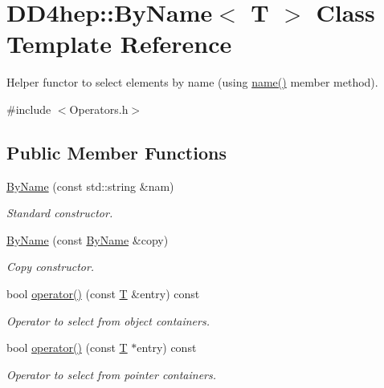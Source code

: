 \hypertarget{class_d_d4hep_1_1_by_name}{
\section{DD4hep::ByName$<$ T $>$ Class Template Reference}
\label{class_d_d4hep_1_1_by_name}
}


Helper functor to select elements by name (using \hyperlink{class_d_d4hep_1_1_by_name_a06f4c668c9195f670ee1ace07191efa1}{name()} member method).  


{\ttfamily \#include $<$Operators.h$>$}\subsection*{Public Member Functions}
\begin{DoxyCompactItemize}
\item 
\hyperlink{class_d_d4hep_1_1_by_name_af56a0a47ed14c746731c5b3d7e4eeadd}{ByName} (const std::string \&nam)
\begin{DoxyCompactList}\small\item\em Standard constructor. \item\end{DoxyCompactList}\item 
\hyperlink{class_d_d4hep_1_1_by_name_a09dee9528eddd3d93d3ab985717dc809}{ByName} (const \hyperlink{class_d_d4hep_1_1_by_name}{ByName} \&copy)
\begin{DoxyCompactList}\small\item\em Copy constructor. \item\end{DoxyCompactList}\item 
bool \hyperlink{class_d_d4hep_1_1_by_name_a63a9653ea07e3a2818c0e77bb2d2914d}{operator()} (const \hyperlink{class_t}{T} \&entry) const 
\begin{DoxyCompactList}\small\item\em Operator to select from object containers. \item\end{DoxyCompactList}\item 
bool \hyperlink{class_d_d4hep_1_1_by_name_aa9b38bd7564f652afd15815c227bd04f}{operator()} (const \hyperlink{class_t}{T} $\ast$entry) const 
\begin{DoxyCompactList}\small\item\em Operator to select from pointer containers. \item\end{DoxyCompactList}\end{DoxyCompactItemize}
